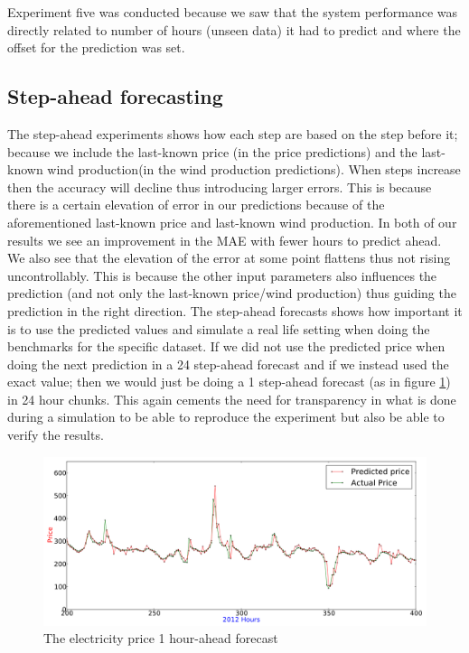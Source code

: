 Experiment five was conducted because we saw that the system performance was directly related to number of hours (unseen data) it had to predict and where the offset for the prediction was set.
\subsection{Step-ahead forecasting}
\label{sec:stepAheadDiscussion}
The step-ahead experiments shows how each step are based on the step before it; because we include the last-known price (in the price predictions) and the last-known wind production(in the wind production predictions). When steps increase then the accuracy will decline thus introducing larger errors. This is because there is a certain elevation of error in our predictions because of the aforementioned last-known price and last-known wind production. In both of our results we see an improvement in the MAE with fewer hours to predict ahead. We also see that the elevation of the error at some point flattens thus not rising uncontrollably. This is because the other input parameters also influences the prediction (and not only the last-known price/wind production) thus guiding the prediction in the right direction. The step-ahead forecasts shows how important it is to use the predicted values and simulate a real life setting when doing the benchmarks for the specific dataset. If we did not use the predicted price when doing the next prediction in a 24 step-ahead forecast and if we instead used the exact value; then we would just be doing a 1 step-ahead forecast (as in figure \ref{fig:1HourAheadPrice_Discussion}) in 24 hour chunks. This again cements the need for transparency in what is done during a simulation to be able to reproduce the experiment but also be able to verify the results.

\begin{figure}[H]
\centering
\includegraphics[width=0.99\linewidth]{billeder/Discussion/1HourAhead_Price.png}
\caption{The electricity price 1 hour-ahead forecast}
\label{fig:1HourAheadPrice_Discussion}
\end{figure}

